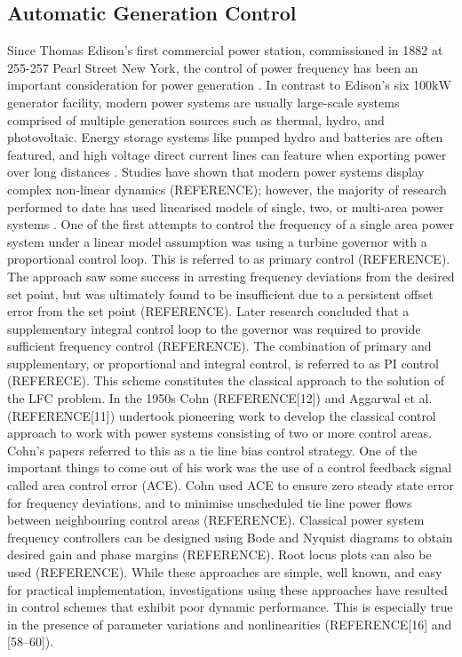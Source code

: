\subsection{Automatic Generation Control}\label{agc}
Since Thomas Edison's first commercial power station, commissioned in 1882 at 255-257 Pearl Street New York, the control of power frequency has been an important consideration for power generation \cite{Cohn1983}. In contrast to Edison's six 100$\si{\kilo\watt}$ generator facility, modern power systems are usually large-scale systems comprised of multiple generation sources such as thermal, hydro, and photovoltaic. Energy storage systems like pumped hydro and batteries are often featured, and high voltage direct current lines can feature when exporting power over long distances \cite{Bevrani2011, Glover2012, Kothari2011, Kundur1994}. Studies have shown that modern power systems display complex non-linear dynamics (REFERENCE); however, the majority of research performed to date has used linearised models of single, two, or multi-area power systems \cite{Kothari2011, Saadat2011, Cohn1956, Bevrani2011, Wood2013, Elgerd1970, Kwatny1975}. One of the first attempts to control the frequency of a single area power system under a linear model assumption was using a turbine governor with a proportional control loop. This is referred to as primary control (REFERENCE). The approach saw some success in arresting frequency deviations from the desired set point, but was ultimately found to be insufficient due to a persistent offset error from the set point (REFERENCE). Later research concluded that a supplementary integral control loop to the governor was required to provide sufficient frequency control (REFERENCE). The combination of primary and supplementary, or proportional and integral control, is referred to as PI control (REFERECE). This scheme constitutes the classical approach to the solution of the LFC problem. In the 1950s Cohn (REFERENCE[12]) and Aggarwal et al. (REFERENCE[11]) undertook pioneering work to develop the classical control approach to work with power systems consisting of two or more control areas. Cohn's papers referred to this as a tie line bias control strategy. One of the important things to come out of his work was the use of a control feedback signal called area control error (ACE). Cohn used ACE to ensure zero steady state error for frequency deviations, and to minimise unscheduled tie line power flows between neighbouring control areas (REFERENCE). Classical power system frequency controllers can be designed using Bode and Nyquist diagrams to obtain desired gain and phase margins (REFERENCE). Root locus plots can also be used (REFERENCE). While these approaches are simple, well known, and easy for practical implementation, investigations using these approaches have resulted in control schemes that exhibit poor dynamic performance. This is especially true in the presence of parameter variations and nonlinearities (REFERENCE[16] and [58–60]).

